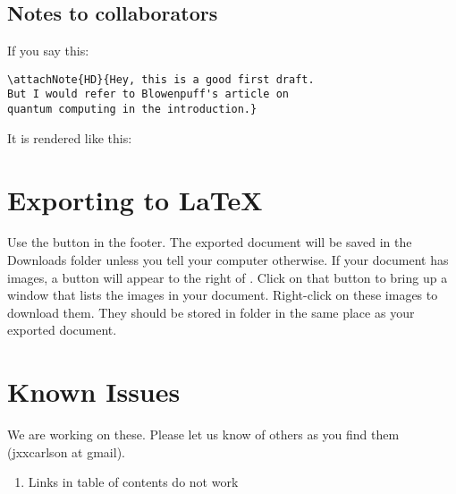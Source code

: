 \subsection{Notes to collaborators}

If you say this:

\begin{verbatim}
\attachNote{HD}{Hey, this is a good first draft.
But I would refer to Blowenpuff's article on
quantum computing in the introduction.}
\end{verbatim}

It is rendered like this:


\section{Exporting to LaTeX}

Use the  button in the footer.  The exported document will be saved in the Downloads folder unless you tell your computer otherwise.  If your document has images, a button  will appear to the right of .  Click on that button to bring up a window that lists the images in your document.  Right-click on these images to download them.  They should be stored in folder  in the same place as your exported document.


\section{Known Issues}

We are working on these.  Please let us know of others as you find them (jxxcarlson at gmail).

\begin{enumerate}

\item Links in table of contents do not work

\end{enumerate}

